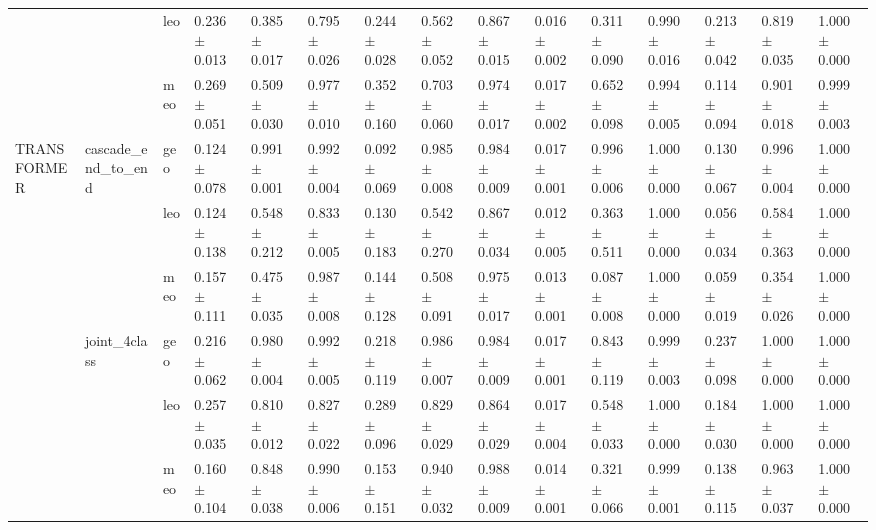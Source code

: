 \begin{table}
\begin{tabular}{lllllllllllllll}
            &              & leo &  0.236 $\pm$ 0.013 &  0.385 $\pm$ 0.017 &          0.795 $\pm$ 0.026 &  0.244 $\pm$ 0.028 &  0.562 $\pm$ 0.052 &          0.867 $\pm$ 0.015 &  0.016 $\pm$ 0.002 &  0.311 $\pm$ 0.090 &          0.990 $\pm$ 0.016 &  0.213 $\pm$ 0.042 &  0.819 $\pm$ 0.035 &          1.000 $\pm$ 0.000 \\
            &              & meo &  0.269 $\pm$ 0.051 &  0.509 $\pm$ 0.030 &          0.977 $\pm$ 0.010 &  0.352 $\pm$ 0.160 &  0.703 $\pm$ 0.060 &          0.974 $\pm$ 0.017 &  0.017 $\pm$ 0.002 &  0.652 $\pm$ 0.098 &          0.994 $\pm$ 0.005 &  0.114 $\pm$ 0.094 &  0.901 $\pm$ 0.018 &          0.999 $\pm$ 0.003 \\
TRANSFORMER & cascade_end_to_end & geo &  0.124 $\pm$ 0.078 &  0.991 $\pm$ 0.001 &          0.992 $\pm$ 0.004 &  0.092 $\pm$ 0.069 &  0.985 $\pm$ 0.008 &          0.984 $\pm$ 0.009 &  0.017 $\pm$ 0.001 &  0.996 $\pm$ 0.006 &          1.000 $\pm$ 0.000 &  0.130 $\pm$ 0.067 &  0.996 $\pm$ 0.004 &          1.000 $\pm$ 0.000 \\
            &              & leo &  0.124 $\pm$ 0.138 &  0.548 $\pm$ 0.212 &          0.833 $\pm$ 0.005 &  0.130 $\pm$ 0.183 &  0.542 $\pm$ 0.270 &          0.867 $\pm$ 0.034 &  0.012 $\pm$ 0.005 &  0.363 $\pm$ 0.511 &          1.000 $\pm$ 0.000 &  0.056 $\pm$ 0.034 &  0.584 $\pm$ 0.363 &          1.000 $\pm$ 0.000 \\
            &              & meo &  0.157 $\pm$ 0.111 &  0.475 $\pm$ 0.035 &          0.987 $\pm$ 0.008 &  0.144 $\pm$ 0.128 &  0.508 $\pm$ 0.091 &          0.975 $\pm$ 0.017 &  0.013 $\pm$ 0.001 &  0.087 $\pm$ 0.008 &          1.000 $\pm$ 0.000 &  0.059 $\pm$ 0.019 &  0.354 $\pm$ 0.026 &          1.000 $\pm$ 0.000 \\
            & joint_4class & geo &  0.216 $\pm$ 0.062 &  0.980 $\pm$ 0.004 &          0.992 $\pm$ 0.005 &  0.218 $\pm$ 0.119 &  0.986 $\pm$ 0.007 &          0.984 $\pm$ 0.009 &  0.017 $\pm$ 0.001 &  0.843 $\pm$ 0.119 &          0.999 $\pm$ 0.003 &  0.237 $\pm$ 0.098 &  1.000 $\pm$ 0.000 &          1.000 $\pm$ 0.000 \\
            &              & leo &  0.257 $\pm$ 0.035 &  0.810 $\pm$ 0.012 &          0.827 $\pm$ 0.022 &  0.289 $\pm$ 0.096 &  0.829 $\pm$ 0.029 &          0.864 $\pm$ 0.029 &  0.017 $\pm$ 0.004 &  0.548 $\pm$ 0.033 &          1.000 $\pm$ 0.000 &  0.184 $\pm$ 0.030 &  1.000 $\pm$ 0.000 &          1.000 $\pm$ 0.000 \\
            &              & meo &  0.160 $\pm$ 0.104 &  0.848 $\pm$ 0.038 &          0.990 $\pm$ 0.006 &  0.153 $\pm$ 0.151 &  0.940 $\pm$ 0.032 &          0.988 $\pm$ 0.009 &  0.014 $\pm$ 0.001 &  0.321 $\pm$ 0.066 &          0.999 $\pm$ 0.001 &  0.138 $\pm$ 0.115 &  0.963 $\pm$ 0.037 &          1.000 $\pm$ 0.000 \\
\bottomrule
\end{tabular}
\end{table}

